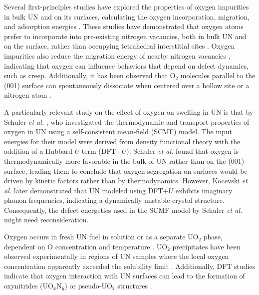 \documentclass[preprint,12pt,sort&compress]{elsarticle}
\newcommand{\?}{\stackrel{?}{=}}
\begin{document}
Several first-principles studies have explored the properties of oxygen impurities in bulk UN and on its surfaces, calculating the oxygen incorporation, migration, and adsorption energies \cite{Kotomin2008, Kotomin2009, Zhukovskii2009JNM, Zhukovskii2009SS, Bocharov2011JNM, Bocharov2011SS, Bocharov2013, Lopes2016, Schuler2017, Zergoug2018, Sikorski2021}. These studies have demonstrated that oxygen atoms prefer to incorporate into pre-existing nitrogen vacancies, both in bulk UN and on the surface, rather than occupying tetrahedral interstitial sites \cite{Kotomin2008, Bocharov2013}. Oxygen impurities also reduce the migration energy of nearby nitrogen vacancies \cite{Kotomin2009}, indicating that oxygen can influence behaviors that depend on defect dynamics, such as creep. Additionally, it has been observed that O$_2$ molecules parallel to the (001) surface can spontaneously dissociate when centered over a hollow site or a nitrogen atom \cite{Zhukovskii2009JNM}.



A particularly relevant study on the effect of oxygen on swelling in UN is that by Schuler \textit{et al.} \cite{Schuler2017}, who investigated the thermodynamic and transport properties of oxygen in UN using a self-consistent mean-field (SCMF) model. The input energies for their model were derived from density functional theory with the addition of a Hubbard $U$ term (DFT+$U$). Schuler \textit{et al.} found that oxygen is thermodynamically more favorable in the bulk of UN rather than on the (001) surface, leading them to conclude that oxygen segregation on surfaces would be driven by kinetic factors rather than by thermodynamics. However, Kocevski \textit{et al.} \cite{Kocevski2022I} later demonstrated that UN modeled using DFT+$U$ exhibits imaginary phonon frequencies, indicating a dynamically unstable crystal structure. Consequently, the defect energetics used in the SCMF model by Schuler \textit{et al.} might need reconsideration. %

Oxygen occurs in fresh UN fuel in solution or as a separate UO$_2$ phase, dependent on O concentration and temperature \cite{Lyubimov2014}. UO$_2$ precipitates have been observed experimentally in regions of UN samples where the local oxygen concentration apparently exceeded the solubility limit \cite{Mishchenko2021}. Additionally, DFT studies indicate that oxygen interaction with UN surfaces can lead to the formation of oxynitrides (UO$_x$N$_y$) or pseudo-UO$_2$ structures \cite{Bocharov2013, Lopes2016}.
\end{document}
